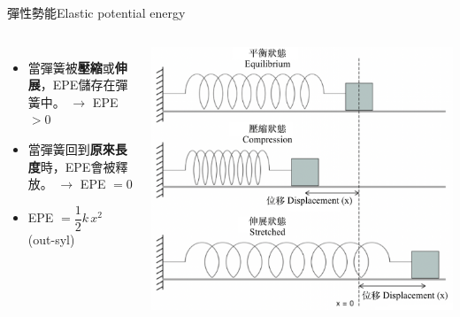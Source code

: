 \documentclass[beamer=true]{standalone}
\begin{document}
\begin{frame}{彈性勢能Elastic potential energy}
    \begin{columns}
        \begin{itemize}
            \setlength{\itemsep}{15pt}
            \item 當彈簧被\textbf{壓縮}或\textbf{伸展}，EPE儲存在彈簧中。 $\rightarrow$ EPE $>0$
            \item 當彈簧回到\textbf{原來長度}時，EPE會被釋放。 $\rightarrow$ EPE $=0$
            \item EPE $=\dfrac{1}{2}k\, x^2$ (out-syl)
        \end{itemize}
        {\par\centering
            \includegraphics[width=\textwidth]{assets/5c1cf9fc.png}
            \par}
    \end{columns}
\end{frame}
\end{document}
